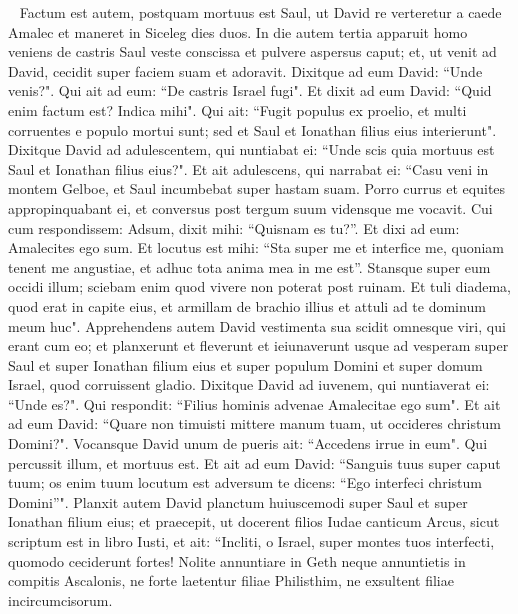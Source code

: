 
\begin{biblechapter}   
\verse Factum est autem, postquam mortuus est Saul, ut David re verteretur a caede Amalec et maneret in Siceleg dies duos. 
\verse In die autem tertia apparuit homo veniens de castris Saul veste conscissa et pulvere aspersus caput; et, ut venit ad David, cecidit super faciem suam et adoravit. 
\verse Dixitque ad eum David: “Unde venis?". Qui ait ad eum: “De castris Israel fugi". 
\verse Et dixit ad eum David: “Quid enim factum est? Indica mihi". Qui ait: “Fugit populus ex proelio, et multi corruentes e populo mortui sunt; sed et Saul et Ionathan filius eius interierunt". 
\verse Dixitque David ad adulescentem, qui nuntiabat ei: “Unde scis quia mortuus est Saul et Ionathan filius eius?". 
\verse Et ait adulescens, qui narrabat ei: “Casu veni in montem Gelboe, et Saul incumbebat super hastam suam. Porro currus et equites appropinquabant ei, 
\verse et conversus post tergum suum vidensque me vocavit. Cui cum respondissem: Adsum, 
\verse dixit mihi: “Quisnam es tu?”. Et dixi ad eum: Amalecites ego sum. 
\verse Et locutus est mihi: “Sta super me et interfice me, quoniam tenent me angustiae, et adhuc tota anima mea in me est”. 
\verse Stansque super eum occidi illum; sciebam enim quod vivere non poterat post ruinam. Et tuli diadema, quod erat in capite eius, et armillam de brachio illius et attuli ad te dominum meum huc". 
\verse Apprehendens autem David vestimenta sua scidit omnesque viri, qui erant cum eo; 
\verse et planxerunt et fleverunt et ieiunaverunt usque ad vesperam super Saul et super Ionathan filium eius et super populum Domini et super domum Israel, quod corruissent gladio. 
\verse Dixitque David ad iuvenem, qui nuntiaverat ei: “Unde es?". Qui respondit: “Filius hominis advenae Amalecitae ego sum". 
\verse Et ait ad eum David: “Quare non timuisti mittere manum tuam, ut occideres christum Domini?". 
\verse Vocansque David unum de pueris ait: “Accedens irrue in eum". Qui percussit illum, et mortuus est. 
\verse Et ait ad eum David: “Sanguis tuus super caput tuum; os enim tuum locutum est adversum te dicens: “Ego interfeci christum Domini”". 
\verse Planxit autem David planctum huiuscemodi super Saul et super Ionathan filium eius; 
\verse et praecepit, ut docerent filios Iudae canticum Arcus, sicut scriptum est in libro Iusti, et ait: 
\verse “Incliti, o Israel, super montes tuos interfecti, quomodo ceciderunt fortes! 
\verse Nolite annuntiare in Geth neque annuntietis in compitis Ascalonis, ne forte laetentur filiae Philisthim, ne exsultent filiae incircumcisorum. 

\end{biblechapter}
